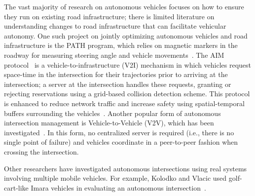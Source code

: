 The vast majority of research on autonomous vehicles focuses on how to
ensure they run on existing road infrastructure; there is limited
literature on understanding changes to road infrastructure that can
facilitate vehicular autonomy.  One such project on jointly optimizing
autonomous vehicles and road infrastructure is the PATH program, which
relies on magnetic markers in the roadway for measuring steering angle
and vehicle movements~\cite{bib:Shladover91Automated}.  The
AIM protocol~\cite{bib:Dresner08Multiagent, bib:Fajardo12Automated,
bib:Quinlan10Bringing} is a vehicle-to-infrastructure (V2I) mechanism in
which vehicles request space-time in the intersection for their
trajectories prior to arriving at the intersection; a server at the
intersection handles these requests, granting or rejecting
reservations using a grid-based collision detection scheme. This
protocol is enhanced to reduce network traffic and increase safety
using spatial-temporal buffers surrounding the vehicles~\cite{bib:Fajardo12Automated}.
Another popular form of autonomous intersection management
is Vehicle-to-Vehicle (V2V), which has been investigated~\cite{naumann97:intersection,
ATT08-vanmiddlesworth}.  In this form, no centralized server is
required (i.e., there is no single point of failure) and vehicles
coordinate in a peer-to-peer fashion when crossing the
intersection.


Other researchers have investigated autonomous intersections using
real systems involving multiple mobile vehicles.  For example, Kolodko
and Vlacic used golf-cart-like Imara vehicles in evaluating an
autonomous intersection~\cite{Kolodko03:INRIA}. 




